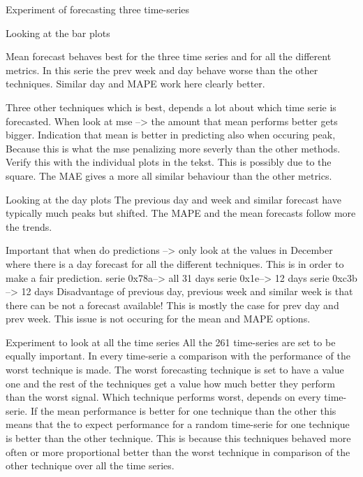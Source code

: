 Experiment of forecasting three time-series

Looking at the bar plots

Mean forecast behaves best  for the three time series and for all the different metrics.
%
In this serie the prev week and day behave worse than the other techniques. Similar day and MAPE work here clearly better.

Three other techniques which is best, depends a lot about which time serie is forecasted. 
When look at mse --> the amount that mean performs better gets bigger. Indication that mean is better in predicting also when occuring peak,
Because this is what the mse penalizing more severly than the other methods. Verify this with the individual plots in the tekst.
This is possibly due to the square. The MAE gives a more all similar behaviour than the other metrics.

Looking at the day plots
The previous day and week and similar forecast have typically much peaks but shifted.
The MAPE and the mean forecasts follow more the trends.

Important that when do predictions --> only look at the values in December where there is a day forecast for all the different techniques. This is in order to make a fair prediction. 
serie 0x78a--> all 31 days
serie 0x1e--> 12 days
serie 0xc3b --> 12 days
Disadvantage of previous day, previous week and similar week is that there can be not a forecast available! 
This is mostly the case for prev day and prev week. This issue is not occuring for the mean and MAPE options. 

Experiment to look at all the time series
All the 261 time-series are set to be equally important. In every time-serie a comparison with the performance of the worst technique is made.
The worst forecasting technique is set to have a value one and the rest of the techniques get a value how much better they perform than the worst signal. Which technique performs worst, depends on every time-serie.
If the mean performance is better for one technique than the other this means that the to expect performance for a random time-serie for one technique is better than the other technique. This is because this techniques behaved  more often or more proportional better than the worst technique in comparison of the other technique over all the time series. 


